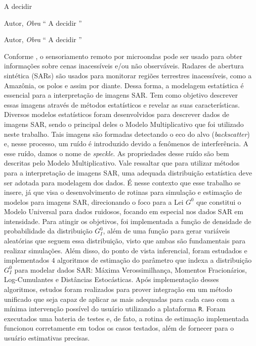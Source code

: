 \documentclass[tcc]{ic}
\begin{document}

\capa

\begin{agradecimentos}

A decidir


\vspace{2em}
\begin{epigraph}{Autor, \textit{Obra}}
`` A decidir ''
\end{epigraph}



\newpage
\thispagestyle{empty}
\vspace*{\fill}
\begin{epigraph}{Autor, \textit{Obra}}
`` A decidir ''
\end{epigraph}

\begin{resumo}

Conforme \citet{FreryMinute2004}, o sensoriamento remoto por microondas pode ser usado para obter informações sobre cenas inacessíveis e/ou não observáveis. Radares de abertura sintética (SARs) são usados para monitorar regiões terrestres inacessíveis, como a Amazônia, os polos e assim por diante.
%
Dessa forma, a modelagem estatística é essencial para a interpretação de imagens SAR. Tem como objetivo descrever essas imagens através de métodos estatísticos e revelar as suas características. Diversos modelos estatísticos foram desenvolvidos para descrever dados de imagens SAR, sendo o principal deles o Modelo Multiplicativo que foi utilizado neste trabalho. Tais imagens são formadas detectando o eco do alvo (\textit{backscatter}) e, nesse processo, um ruído é introduzido devido a fenômenos de interferência. A esse ruído, damos o nome de \textit{speckle}. As propriedades desse ruído são bem descritas pelo Modelo Multiplicativo.
%
Vale ressaltar que para utilizar métodos para a interpretação de imagens SAR, uma adequada distribuição estatística deve ser adotada para modelagem dos dados. É nesse contexto que esse trabalho se insere, já que visa o desenvolvimento de rotinas para simulação e estimação de modelos para imagens SAR, direcionando o foco para a Lei $G^{0}$ que constitui o Modelo Universal para dados ruidosos, focando em especial nos dados SAR em intensidade.  
%
Para atingir os objetivos, foi implementada a função de densidade de probabilidade da distribuição $G_I^0$, além de uma função para gerar variáveis aleatórias que seguem essa distribuição, visto que ambas são fundamentais para realizar simulações. Além disso, do ponto de vista inferencial, foram estudados e implementados $4$ algoritmos de estimação do parâmetro que indexa a distribuição $G_I^{0}$ para modelar dados SAR: Máxima Verossimilhança, Momentos Fracionários, Log-Cumulantes e Distâncias Estocásticas.
%
Após implementação desses algoritmos, estudos foram realizados para prover integração em um método unificado que seja capaz de aplicar as mais adequadas para cada caso com a mínima intervenção possível do usuário utilizando a plataforma \texttt{R}. Foram executados uma bateria de testes e, de fato, a rotina de estimação implementada funcionou corretamente em todos os casos testados, além de fornecer para o usuário estimativas precisas.


\end{resumo}
\end{agradecimentos}
\end{document}
